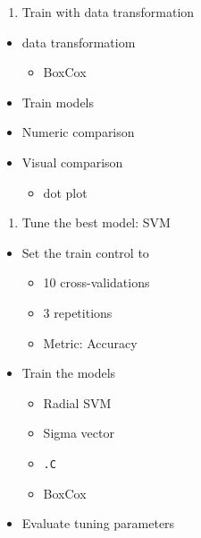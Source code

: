 \documentclass[]{book}
\providecommand{\tightlist}{%
  \setlength{\itemsep}{0pt}\setlength{\parskip}{0pt}}
\begin{document}
\begin{enumerate}
\def\labelenumi{\arabic{enumi}.}
\setcounter{enumi}{6}
\tightlist
\item
  Train with data transformation
\end{enumerate}

\begin{itemize}
\tightlist
\item
  data transformatiom

  \begin{itemize}
  \tightlist
  \item
    BoxCox
  \end{itemize}
\item
  Train models
\item
  Numeric comparison
\item
  Visual comparison

  \begin{itemize}
  \tightlist
  \item
    dot plot
  \end{itemize}
\end{itemize}

\begin{enumerate}
\def\labelenumi{\arabic{enumi}.}
\setcounter{enumi}{7}
\tightlist
\item
  Tune the best model: SVM
\end{enumerate}

\begin{itemize}
\tightlist
\item
  Set the train control to

  \begin{itemize}
  \tightlist
  \item
    10 cross-validations
  \item
    3 repetitions
  \item
    Metric: Accuracy
  \end{itemize}
\item
  Train the models

  \begin{itemize}
  \tightlist
  \item
    Radial SVM
  \item
    Sigma vector
  \item
    \texttt{.C}
  \item
    BoxCox
  \end{itemize}
\item
  Evaluate tuning parameters
\end{itemize}
\end{document}
